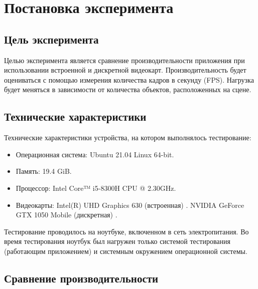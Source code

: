 \section{Постановка эксперимента}
\subsection{Цель эксперимента}

Целью эксперимента является сравнение производительности приложения при использовании встроенной и 
дискретной видеокарт.
Производительность будет оцениваться с помощью измерения количества кадров в секунду (FPS).
Нагрузка будет меняться в зависимости от количества объектов, расположенных на сцене.  

\subsection{Технические характеристики}

Технические характеристики устройства, на котором выполнялось тестирование:

\begin{itemize}
	\item Операционная система: Ubuntu 21.04 \cite{ubuntu} Linux \cite{linux} 64-bit.
	\item Память: 19.4 GiB.
	\item Процессор: Intel Core™ i5-8300H \cite{intel} CPU @ 2.30GHz.
	\item Видеокарты: 
  \subitem Intel(R) UHD Graphics 630 (встроенная) \cite{intel-graphics}.
  \subitem NVIDIA GeForce GTX 1050 Mobile (дискретная) \cite{nvidia-gtx1050m}.
\end{itemize}
Тестирование проводилось на ноутбуке, включенном в сеть электропитания. Во время тестирования ноутбук был нагружен только системой тестирования (работающим приложением) и системным окружением операционной системы.

\subsection{Сравнение производительности}

